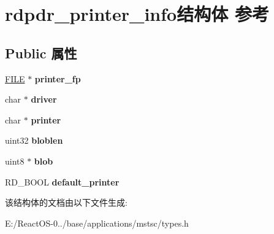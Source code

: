 \hypertarget{structrdpdr__printer__info}{}\section{rdpdr\+\_\+printer\+\_\+info结构体 参考}
\label{structrdpdr__printer__info}
\subsection*{Public 属性}
\begin{DoxyCompactItemize}
\item 
\mbox{\label{structrdpdr__printer__info_aaf6b8458766813644ab21d1fc099f34f}} 
\hyperlink{struct__iobuf}{F\+I\+LE} $\ast$ {\bfseries printer\+\_\+fp}
\item 
\mbox{\label{structrdpdr__printer__info_a182cce0b5e413ab1daa001f0e936e8c2}} 
char $\ast$ {\bfseries driver}
\item 
\mbox{\label{structrdpdr__printer__info_a1631fc464356c53a53580094f0e01f78}} 
char $\ast$ {\bfseries printer}
\item 
\mbox{\label{structrdpdr__printer__info_a881c4ab8fcd3d492dea420c54ed679e3}} 
uint32 {\bfseries bloblen}
\item 
\mbox{\label{structrdpdr__printer__info_adee676b8f765706dacc76bf9ea134446}} 
uint8 $\ast$ {\bfseries blob}
\item 
\mbox{\label{structrdpdr__printer__info_aad740eb4e2869423c158f7a3385ee957}} 
R\+D\+\_\+\+B\+O\+OL {\bfseries default\+\_\+printer}
\end{DoxyCompactItemize}


该结构体的文档由以下文件生成\+:\begin{DoxyCompactItemize}
\item 
E\+:/\+React\+O\+S-\/0../base/applications/mstsc/types.\+h\end{DoxyCompactItemize}
